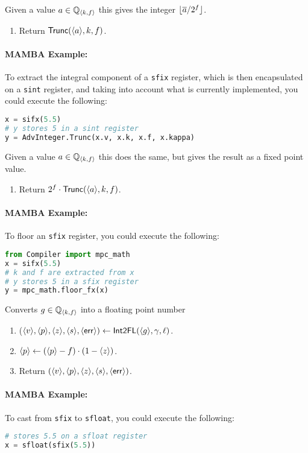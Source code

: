   Given a value $a \in {\mathbb{Q}}_{\langle k, f \rangle}$ this gives the integer
${\lfloor \overline{a}/2^f \rfloor}$.
  \begin{enumerate}
    \item Return $\mathsf{Trunc}(\langle a \rangle,k,f)$.
  \end{enumerate}

  \paragraph{MAMBA Example:} To extract the integral component of a \verb|sfix| register, which is then encapsulated on a \verb|sint| register,
  and taking into account what is currently implemented, you could execute the following:
  \begin{lstlisting}[language={python}]
x = sifx(5.5)
# y stores 5 in a sint register
y = AdvInteger.Trunc(x.v, x.k, x.f, x.kappa)
\end{lstlisting}
  Given a value $a \in {\mathbb{Q}}_{\langle k, f \rangle}$ this does the same, but
  gives the result as a fixed point value.
  \begin{enumerate}
    \item Return $2^f \cdot \mathsf{Trunc}(\langle a \rangle,k,f)$.
  \end{enumerate}
  \paragraph{MAMBA Example:} To floor an \verb|sfix| register, you could execute the following:
  \begin{lstlisting}[language={python}]
from Compiler import mpc_math
x = sifx(5.5)
# k and f are extracted from x
# y stores 5 in a sfix register
y = mpc_math.floor_fx(x)
\end{lstlisting}

  Converts $g \in {\mathbb{Q}}_{\langle k, f \rangle}$ into a floating point number
  \begin{enumerate}
    \item ($\langle v \rangle,\langle p \rangle,\langle z \rangle,\langle s \rangle,\langle \mathsf{err} \rangle)
            \leftarrow \mathsf{Int2FL}(\langle g \rangle,\gamma,\ell)$.
    \item $\langle p \rangle \leftarrow (\langle p \rangle-f) \cdot (1-\langle z \rangle)$.
    \item Return $(\langle v \rangle,\langle p \rangle,\langle z \rangle,\langle s \rangle,\langle \mathsf{err} \rangle)$.
  \end{enumerate}
  \paragraph{MAMBA Example:} To cast from \verb|sfix| to \verb|sfloat|, you could execute the following:
  \begin{lstlisting}[language={python}]
# stores 5.5 on a sfloat register
x = sfloat(sfix(5.5))
\end{lstlisting}


